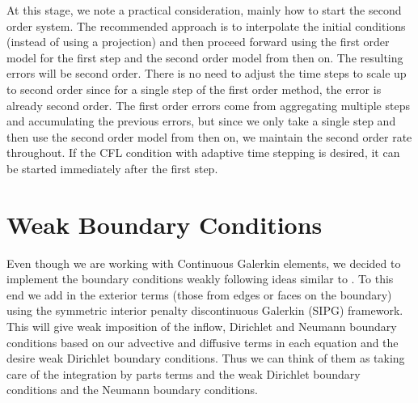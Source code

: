 \documentclass[letterpaper]{erdc}
\begin{document}
\begin{remark}
  At this stage, we note a practical consideration, mainly how to start the
  second order system.  The recommended approach is to interpolate the initial
  conditions (instead of using a projection) and then proceed forward using the
  first order model for the first step and the second order model from then on.
  The resulting errors will be second order.  There is no need to adjust the
  time steps to scale up to second order since for a single step of the first
  order method, the error is already second order.  The first order errors come
  from aggregating multiple steps and accumulating the previous errors, but
  since we only take a single step and then use the second order model from
  then on, we maintain the second order rate throughout.  If the CFL condition
  with adaptive time stepping is desired, it can be started immediately after
  the first step.
\end{remark}


%
%
%
\section{Weak Boundary Conditions}\label{sec:WeakBoundaryConditions}

Even though we are working with Continuous Galerkin elements, we decided to
implement the boundary conditions weakly following ideas similar to
\cite{bazilevs2007weak}.  To this end we add in the exterior terms (those from
edges or faces on the boundary) using the symmetric interior penalty
discontinuous Galerkin (SIPG) framework.  This will give weak imposition of the
inflow, Dirichlet and Neumann boundary conditions based on our advective and
diffusive terms in each equation and the desire weak Dirichlet boundary
conditions.  Thus we can think of them as taking care of the integration by
parts terms and the weak Dirichlet boundary conditions and the Neumann boundary
conditions.
\end{document}
